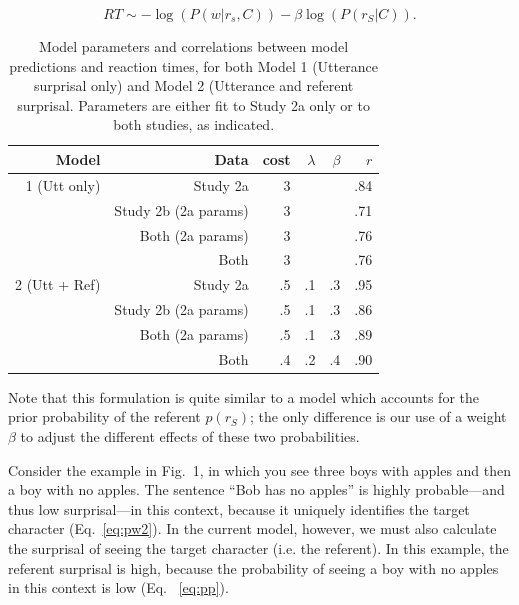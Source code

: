 \documentclass[10pt,letterpaper]{article}
\begin{document}
\begin{equation}\label{eq:total}
RT \sim - \log(P(w|r_s, C)) - \beta \log(P(r_S|C)).
\end{equation}

\begin{table}[t]
\caption{\label{tab:modelcorrs} Model parameters and correlations between model predictions and reaction times, for both Model 1 (Utterance surprisal only) and Model 2 (Utterance and referent surprisal.  Parameters are either fit to Study 2a only or to both studies, as indicated.}
\begin{center}
\small\addtolength{\tabcolsep}{-2pt}
\begin{tabular}{ r| r|  r  r  r  r} 
  \bf{Model} & \bf{Data} & \bf{cost} & \bf{$\lambda$} & \bf{$\beta$} & \bf{$r$}  \\ \hline        
1 (Utt only) &  Study 2a  & 3 & & & .84\\     
& Study 2b (2a params) & 3  & & & .71\\
  & Both (2a params) &  3 & &  & .76 \\
  & Both & 3 &   &   & .76 \\ \hline
2 (Utt + Ref)  & Study 2a & .5 & .1 & .3 & .95\\     
& Study 2b (2a params) & .5  & .1 & .3 & .86\\
  & Both (2a params) &  .5 & .1 & .3 & .89\\
  & Both & .4 &   .2 &  .4 & .90\\ 
\hline
\end{tabular}
\end{center}
\end{table}

\noindent Note that this formulation is quite similar to a model which accounts for the prior probability of the referent $p(r_S)$; the only difference is our use of a weight $\beta$ to adjust the different effects of these two probabilities.  

Consider the example in Fig.\ 1, in which you see three boys with apples and then a boy with no apples.  The sentence ``Bob has no apples'' is highly probable---and thus low surprisal---in this context, because it uniquely identifies the target character (Eq.\ \ref{eq:pw2}).  In the current model, however, we must also calculate the surprisal of seeing the target character (i.e. the referent).  In this example, the referent surprisal is high, because the probability of seeing a boy with no apples in this context is low (Eq. \ \ref{eq:pp}).  
\end{document}
